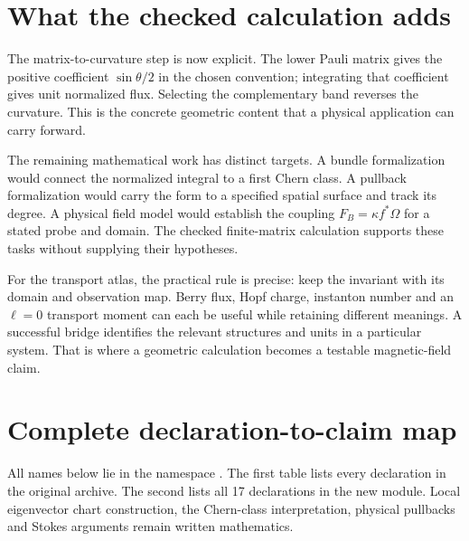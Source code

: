 \documentclass[11pt]{article}
\theoremstyle{definition}\newtheorem{definition}[theorem]{Definition}
\theoremstyle{remark}\newtheorem{remark}[theorem]{Remark}
\newcommand{\leanname}[1]{\texttt{\small\detokenize{#1}}}
\begin{document}
\section{What the checked calculation adds}
The matrix-to-curvature step is now explicit. The lower Pauli matrix gives the positive coefficient $\sin\theta/2$ in the chosen convention; integrating that coefficient gives unit normalized flux. Selecting the complementary band reverses the curvature. This is the concrete geometric content that a physical application can carry forward.

The remaining mathematical work has distinct targets. A bundle formalization would connect the normalized integral to a first Chern class. A pullback formalization would carry the form to a specified spatial surface and track its degree. A physical field model would establish the coupling $F_B=\kappa f^*\Omega$ for a stated probe and domain. The checked finite-matrix calculation supports these tasks without supplying their hypotheses.

For the transport atlas, the practical rule is precise: keep the invariant with its domain and observation map. Berry flux, Hopf charge, instanton number and an $\ell=0$ transport moment can each be useful while retaining different meanings. A successful bridge identifies the relevant structures and units in a particular system. That is where a geometric calculation becomes a testable magnetic-field claim.

\appendix
\section{Complete declaration-to-claim map}\label{sec:map}
All names below lie in the namespace \leanname{MonopoleStance}. The first table lists every declaration in the original archive. The second lists all 17 declarations in the new module. Local eigenvector chart construction, the Chern-class interpretation, physical pullbacks and Stokes arguments remain written mathematics.
\end{document}
